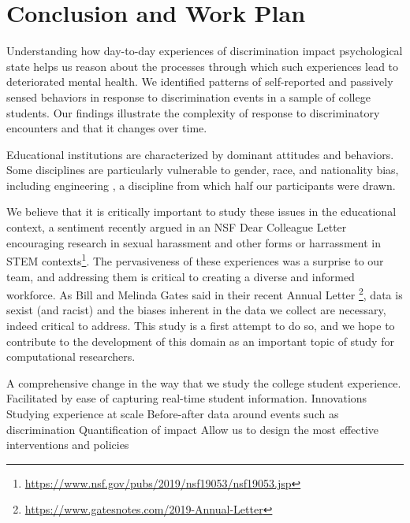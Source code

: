 \section{Conclusion and Work Plan}
\label{sec:conclusion}
Understanding how day-to-day experiences of discrimination impact psychological state helps us reason about the processes through which such experiences lead to deteriorated mental health. We identified patterns of self-reported and passively sensed behaviors in response to discrimination events in a sample of college students. Our findings illustrate the complexity of response to discriminatory encounters and that it changes over time.%

Educational institutions are characterized by dominant attitudes and behaviors. Some disciplines are particularly vulnerable to gender, race, and nationality bias, including  engineering \cite{sevo2010bias}, a discipline from which half our participants were drawn.  %

We believe that it is critically important to study these issues in the educational context, a sentiment recently argued in an NSF Dear Colleague Letter encouraging research in sexual harassment and other forms or harrassment in STEM contexts\footnote{\url{https://www.nsf.gov/pubs/2019/nsf19053/nsf19053.jsp}}. The pervasiveness of these experiences was a surprise to our team, and addressing them is critical to creating a diverse and informed workforce. %
As Bill and Melinda Gates said in their  recent Annual Letter \footnote{\url{https://www.gatesnotes.com/2019-Annual-Letter}}, data is sexist (and racist) and the biases inherent in the data we collect are necessary, indeed critical to address. This study is a first attempt to do so, and we hope to contribute to the development of this domain as an important topic of study for computational researchers.   %

A comprehensive change in the way that we study the college student experience. 
Facilitated by ease of capturing real-time student information. 
Innovations
Studying experience at scale
Before-after data around events such as discrimination
Quantification of impact
Allow us to design the most effective interventions and policies

